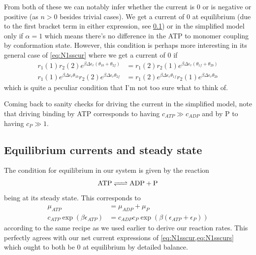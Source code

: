 \documentclass[11pt]{article}
\begin{document}
From both of these we can notably infer whether the current is 0 or is negative or positive (as $n>0$ besides trivial cases).
We get a current of 0 at equilibrium (due to the first bracket term in either expression, see \cref{sec:eqcurss}) or in the simplified model only if $\alpha = 1$ which means there's no difference in the ATP to monomer coupling by conformation state.
However, this condition is perhaps more interesting in its general case of \cref{eq:N1sscur} where we get a current of 0 if
\begin{align}
    r_{1}(1) r_{2}(2) e^{\beta\Delta\epsilon_{r} \left( \theta_{1b} + \theta_{2f} \right)} &= 
    r_{1}(2) r_{2}(1) e^{\beta\Delta\epsilon_{r} \left( \theta_{1f} + \theta_{2b} \right)} \\
    r_{1}(1) e^{\beta\Delta\epsilon_{r}\theta_{1b}} r_{2}(2) e^{\beta\Delta\epsilon_{r}\theta_{2f}} &= 
    r_{1}(2) e^{\beta\Delta\epsilon_{r}\theta_{1f}} r_{2}(1) e^{\beta\Delta\epsilon_{r}\theta_{2b}}
\end{align}
which is quite a peculiar condition that I'm not too sure what to think of.

Coming back to sanity checks for driving the current in the simplified model, note that driving binding by ATP corresponds to having $c_{ATP} \gg c_{ADP}$ and by P to having $c_P \gg 1$.

\subsection{Equilibrium currents and steady state}\label{sec:eqcurss}
The condition for equilibrium in our system is given by the reaction
\begin{equation}
    \ce{ATP <=> ADP + P}
\end{equation}
being at its steady state.
This corresponds to
\begin{align}
    \mu_{ATP} &= \mu_{ADP}+\mu_P \\
    c_{ATP}\exp(\beta \epsilon_{ATP}) &= c_{ADP}c_P\exp(\beta (\epsilon_{ATP} + \epsilon_P))
\end{align}
according to the same recipe as we used earlier to derive our reaction rates.
This perfectly agrees with our net current expressions of \cref{eq:N1sscur,eq:N1sscurs} which ought to both be 0 at equilibrium by detailed balance.
\end{document}
